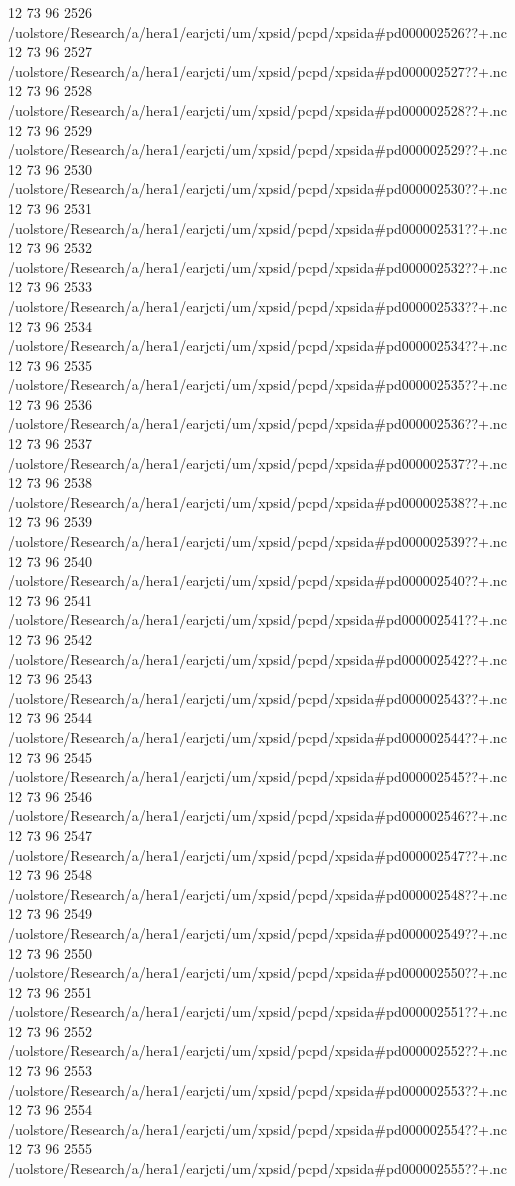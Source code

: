 12 73 96
2526
/uolstore/Research/a/hera1/earjcti/um/xpsid/pcpd/xpsida#pd000002526??+.nc
12 73 96
2527
/uolstore/Research/a/hera1/earjcti/um/xpsid/pcpd/xpsida#pd000002527??+.nc
12 73 96
2528
/uolstore/Research/a/hera1/earjcti/um/xpsid/pcpd/xpsida#pd000002528??+.nc
12 73 96
2529
/uolstore/Research/a/hera1/earjcti/um/xpsid/pcpd/xpsida#pd000002529??+.nc
12 73 96
2530
/uolstore/Research/a/hera1/earjcti/um/xpsid/pcpd/xpsida#pd000002530??+.nc
12 73 96
2531
/uolstore/Research/a/hera1/earjcti/um/xpsid/pcpd/xpsida#pd000002531??+.nc
12 73 96
2532
/uolstore/Research/a/hera1/earjcti/um/xpsid/pcpd/xpsida#pd000002532??+.nc
12 73 96
2533
/uolstore/Research/a/hera1/earjcti/um/xpsid/pcpd/xpsida#pd000002533??+.nc
12 73 96
2534
/uolstore/Research/a/hera1/earjcti/um/xpsid/pcpd/xpsida#pd000002534??+.nc
12 73 96
2535
/uolstore/Research/a/hera1/earjcti/um/xpsid/pcpd/xpsida#pd000002535??+.nc
12 73 96
2536
/uolstore/Research/a/hera1/earjcti/um/xpsid/pcpd/xpsida#pd000002536??+.nc
12 73 96
2537
/uolstore/Research/a/hera1/earjcti/um/xpsid/pcpd/xpsida#pd000002537??+.nc
12 73 96
2538
/uolstore/Research/a/hera1/earjcti/um/xpsid/pcpd/xpsida#pd000002538??+.nc
12 73 96
2539
/uolstore/Research/a/hera1/earjcti/um/xpsid/pcpd/xpsida#pd000002539??+.nc
12 73 96
2540
/uolstore/Research/a/hera1/earjcti/um/xpsid/pcpd/xpsida#pd000002540??+.nc
12 73 96
2541
/uolstore/Research/a/hera1/earjcti/um/xpsid/pcpd/xpsida#pd000002541??+.nc
12 73 96
2542
/uolstore/Research/a/hera1/earjcti/um/xpsid/pcpd/xpsida#pd000002542??+.nc
12 73 96
2543
/uolstore/Research/a/hera1/earjcti/um/xpsid/pcpd/xpsida#pd000002543??+.nc
12 73 96
2544
/uolstore/Research/a/hera1/earjcti/um/xpsid/pcpd/xpsida#pd000002544??+.nc
12 73 96
2545
/uolstore/Research/a/hera1/earjcti/um/xpsid/pcpd/xpsida#pd000002545??+.nc
12 73 96
2546
/uolstore/Research/a/hera1/earjcti/um/xpsid/pcpd/xpsida#pd000002546??+.nc
12 73 96
2547
/uolstore/Research/a/hera1/earjcti/um/xpsid/pcpd/xpsida#pd000002547??+.nc
12 73 96
2548
/uolstore/Research/a/hera1/earjcti/um/xpsid/pcpd/xpsida#pd000002548??+.nc
12 73 96
2549
/uolstore/Research/a/hera1/earjcti/um/xpsid/pcpd/xpsida#pd000002549??+.nc
12 73 96
2550
/uolstore/Research/a/hera1/earjcti/um/xpsid/pcpd/xpsida#pd000002550??+.nc
12 73 96
2551
/uolstore/Research/a/hera1/earjcti/um/xpsid/pcpd/xpsida#pd000002551??+.nc
12 73 96
2552
/uolstore/Research/a/hera1/earjcti/um/xpsid/pcpd/xpsida#pd000002552??+.nc
12 73 96
2553
/uolstore/Research/a/hera1/earjcti/um/xpsid/pcpd/xpsida#pd000002553??+.nc
12 73 96
2554
/uolstore/Research/a/hera1/earjcti/um/xpsid/pcpd/xpsida#pd000002554??+.nc
12 73 96
2555
/uolstore/Research/a/hera1/earjcti/um/xpsid/pcpd/xpsida#pd000002555??+.nc
